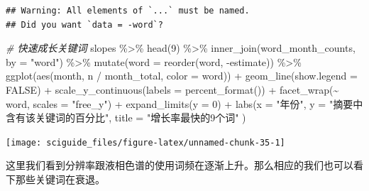 \documentclass[]{tufte-book}
\newenvironment{Shaded}{}{}
\newcommand{\AttributeTok}[1]{\textcolor[rgb]{0.49,0.56,0.16}{#1}}
\newcommand{\CommentTok}[1]{\textcolor[rgb]{0.38,0.63,0.69}{\textit{#1}}}
\newcommand{\ConstantTok}[1]{\textcolor[rgb]{0.53,0.00,0.00}{#1}}
\newcommand{\DecValTok}[1]{\textcolor[rgb]{0.25,0.63,0.44}{#1}}
\newcommand{\FunctionTok}[1]{\textcolor[rgb]{0.02,0.16,0.49}{#1}}
\newcommand{\NormalTok}[1]{#1}
\newcommand{\SpecialCharTok}[1]{\textcolor[rgb]{0.25,0.44,0.63}{#1}}
\newcommand{\StringTok}[1]{\textcolor[rgb]{0.25,0.44,0.63}{#1}}
\begin{document}
\begin{verbatim}
## Warning: All elements of `...` must be named.
## Did you want `data = -word`?
\end{verbatim}

\begin{Shaded}
\begin{Highlighting}[]
\CommentTok{\# 快速成长关键词}
\NormalTok{slopes }\SpecialCharTok{\%\textgreater{}\%}
  \FunctionTok{head}\NormalTok{(}\DecValTok{9}\NormalTok{) }\SpecialCharTok{\%\textgreater{}\%}
  \FunctionTok{inner\_join}\NormalTok{(word\_month\_counts, }\AttributeTok{by =} \StringTok{"word"}\NormalTok{) }\SpecialCharTok{\%\textgreater{}\%}
  \FunctionTok{mutate}\NormalTok{(}\AttributeTok{word =} \FunctionTok{reorder}\NormalTok{(word, }\SpecialCharTok{{-}}\NormalTok{estimate)) }\SpecialCharTok{\%\textgreater{}\%}
  \FunctionTok{ggplot}\NormalTok{(}\FunctionTok{aes}\NormalTok{(month, n }\SpecialCharTok{/}\NormalTok{ month\_total, }\AttributeTok{color =}\NormalTok{ word)) }\SpecialCharTok{+}
  \FunctionTok{geom\_line}\NormalTok{(}\AttributeTok{show.legend =} \ConstantTok{FALSE}\NormalTok{) }\SpecialCharTok{+}
  \FunctionTok{scale\_y\_continuous}\NormalTok{(}\AttributeTok{labels =} \FunctionTok{percent\_format}\NormalTok{()) }\SpecialCharTok{+}
  \FunctionTok{facet\_wrap}\NormalTok{(}\SpecialCharTok{\textasciitilde{}}\NormalTok{ word, }\AttributeTok{scales =} \StringTok{"free\_y"}\NormalTok{) }\SpecialCharTok{+}
  \FunctionTok{expand\_limits}\NormalTok{(}\AttributeTok{y =} \DecValTok{0}\NormalTok{) }\SpecialCharTok{+}
  \FunctionTok{labs}\NormalTok{(}\AttributeTok{x =} \StringTok{"年份"}\NormalTok{,}
       \AttributeTok{y =} \StringTok{"摘要中含有该关键词的百分比"}\NormalTok{,}
       \AttributeTok{title =} \StringTok{"增长率最快的9个词"}
\NormalTok{              )}
\end{Highlighting}
\end{Shaded}

\texttt{[image: sciguide\_files/figure-latex/unnamed-chunk-35-1]}

这里我们看到分辨率跟液相色谱的使用词频在逐渐上升。那么相应的我们也可以看下那些关键词在衰退。
\end{document}
